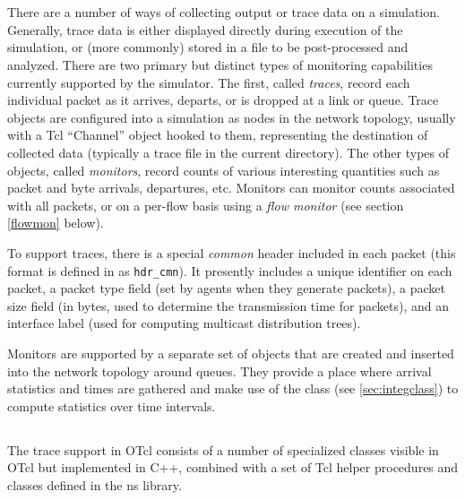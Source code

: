 %
%
\chapter{}

There are a number of ways of collecting output or
trace data on a simulation.
Generally, trace data is either displayed directly during execution
of the simulation, or (more commonly) stored in a file to be
post-processed and analyzed.
There are two primary but distinct types of monitoring capabilities
currently supported by the simulator.
The first, called {\em traces}, record each individual packet
as it arrives, departs, or is dropped at a link or queue.
Trace objects are configured into a simulation as nodes in the
network topology, usually with a Tcl ``Channel'' object
hooked to them, representing the destination of collected data
(typically a trace file in the current directory).
The other types of objects, called {\em monitors}, record counts
of various interesting quantities such as packet and byte arrivals,
departures, etc.
Monitors can monitor counts associated with all packets,
or on a per-flow basis using a {\em flow monitor}
(see section \ref{flowmon} below).

To support traces, there is a special {\em common} header
included in each packet (this format is defined in 
as {\tt hdr\_cmn}).
It presently includes a unique identifier on each packet, a
packet type field (set by agents when they generate packets),
a packet size field (in bytes, used to determine the transmission
time for packets), and an interface label (used for computing
multicast distribution trees).

Monitors are supported by a separate
set of objects that are created and inserted into the network topology
around queues.
They provide a place where
arrival statistics and times are gathered and make
use of the  class (see \ref{sec:integclass}) to
compute statistics over time intervals.

\section{}

The trace support in OTcl consists of a number of specialized
classes visible in OTcl but implemented in C++, combined
with a set of Tcl helper procedures and classes defined in the ns library.

